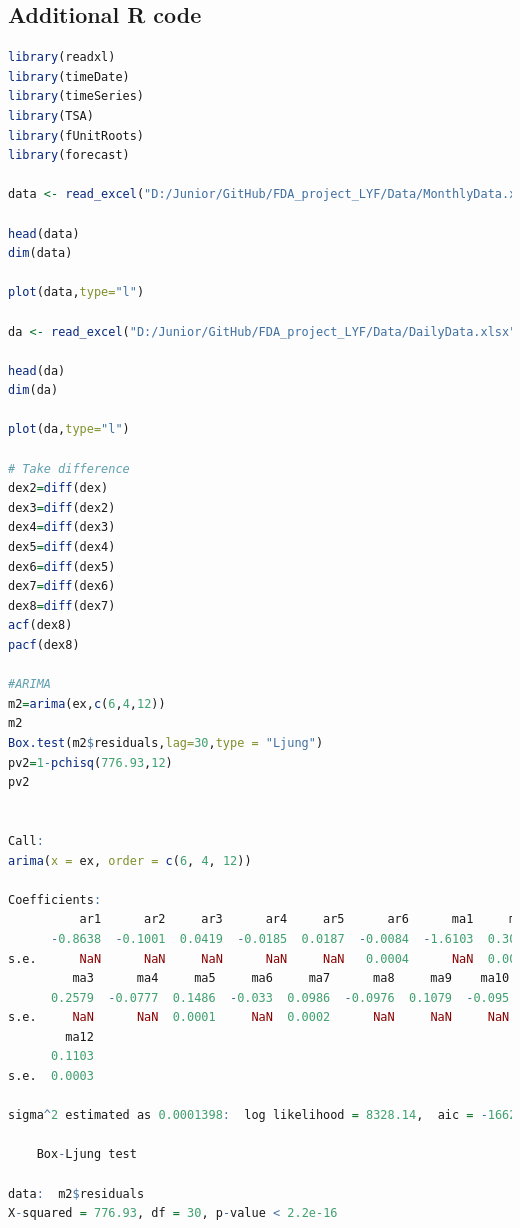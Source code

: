 \documentclass[12pt, a4paper, titlepage]{article}
\begin{document}
\subsection{Additional R code}
\begin{lstlisting}[language=R] 
library(readxl)
library(timeDate)
library(timeSeries)
library(TSA)
library(fUnitRoots)
library(forecast)

data <- read_excel("D:/Junior/GitHub/FDA_project_LYF/Data/MonthlyData.xls")

head(data)
dim(data)

plot(data,type="l")

da <- read_excel("D:/Junior/GitHub/FDA_project_LYF/Data/DailyData.xlsx")

head(da)
dim(da)

plot(da,type="l")

# Take difference
dex2=diff(dex)
dex3=diff(dex2)
dex4=diff(dex3)
dex5=diff(dex4)
dex6=diff(dex5)
dex7=diff(dex6)
dex8=diff(dex7)
acf(dex8)
pacf(dex8)

#ARIMA
m2=arima(ex,c(6,4,12))
m2
Box.test(m2$residuals,lag=30,type = "Ljung")
pv2=1-pchisq(776.93,12)
pv2


Call:
arima(x = ex, order = c(6, 4, 12))

Coefficients:
          ar1      ar2     ar3      ar4     ar5      ar6      ma1     ma2
      -0.8638  -0.1001  0.0419  -0.0185  0.0187  -0.0084  -1.6103  0.3084
s.e.      NaN      NaN     NaN      NaN     NaN   0.0004      NaN  0.0003
         ma3      ma4     ma5     ma6     ma7      ma8     ma9    ma10     ma11
      0.2579  -0.0777  0.1486  -0.033  0.0986  -0.0976  0.1079  -0.095  -0.1169
s.e.     NaN      NaN  0.0001     NaN  0.0002      NaN     NaN     NaN   0.0004
        ma12
      0.1103
s.e.  0.0003

sigma^2 estimated as 0.0001398:  log likelihood = 8328.14,  aic = -16620.28

	Box-Ljung test

data:  m2$residuals
X-squared = 776.93, df = 30, p-value < 2.2e-16
\end{lstlisting}
\end{document}
